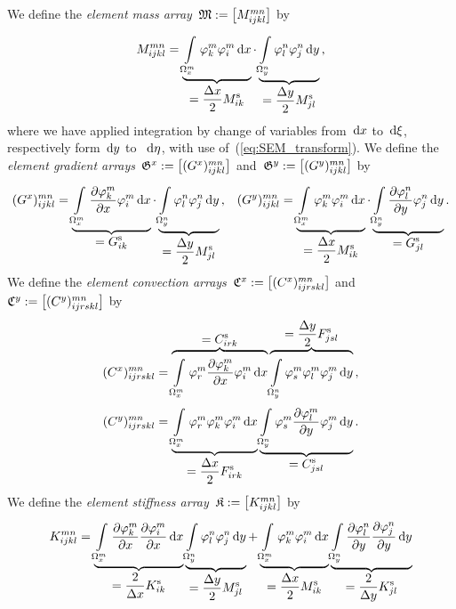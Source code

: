 \documentclass[10pt, ngerman, english,
twoside, open=right,
numbers=noenddot,
declaration=section,
abstract=section,
abstract=multiple,
abstract=notoc,
declaration=notoc,
cd=pale, 
chapterprefix=off, 
chapterpage=false, 
headingsvskip=-10em,
cdgeometry=custom, 
slantedgreek=on,
cdmath=on, 
cdfont=on,
ttfont=false,
mathswap=off,
]{tudscrreprt}
\numberwithin{equation}{chapter}
\newcommand{\sidenote}[1]{
  \leavevmode %
  \marginpar{\hyphenpenalty=1000 \flushleft{\textcolor{HKS41}{#1}}}}
\begin{document}
\sidenote{Element Arrays}We define the \textit{element mass array}~$\emat{M}:=\big[M^{mn}_{ijkl}\big]$ by
\begin{equation}
M^{mn}_{ijkl} = \underbrace{\bint{\varphi^m_k \varphi^m_i}{x}{\Omega_x^m}{}}_{\displaystyle = \frac{\Delta x}{2} M^\text{s}_{ik}} \cdot \underbrace{\bint{\varphi^n_l \varphi^n_j}{y}{\Omega_y^n}{}}_{\displaystyle = \frac{\Delta y}{2} M^\text{s}_{jl}}\text{,}
\end{equation}
where we have applied integration by change of variables from~$\d x$ to~$\d \xi$, respectively form~$\d y$ to ~$\d \eta$, with use of~(\ref{eq:SEM_transform}).
We define the \textit{element gradient arrays}~$\emat{G}^x := \big[(G^x)^{mn}_{ijkl}\big]$ and~$\emat{G}^y := \big[(G^y)^{mn}_{ijkl}\big]$ by
\begin{equation}
(G^x)^{mn}_{ijkl} = \underbrace{\bint{\pdiff{\varphi^m_k}{x} \varphi^m_i}{x}{\Omega_x^m}{}}_{\displaystyle = G^\text{s}_{ik}} \cdot \underbrace{\bint{\varphi^n_l \varphi^n_j}{y}{\Omega_y^n}{}}_{\displaystyle = \frac{\Delta y}{2} M^\text{s}_{jl}}\text{,} \quad
(G^y)^{mn}_{ijkl} = \underbrace{\bint{\varphi^m_k \varphi^m_i}{x}{\Omega_x^m}{}}_{\displaystyle = \frac{\Delta x}{2} M^\text{s}_{ik}} \cdot \underbrace{\bint{\pdiff{\varphi^n_l}{y} \varphi^n_j}{y}{\Omega_y^n}{}}_{\displaystyle = G^\text{s}_{jl}}\text{.}
\end{equation}
We define the \textit{element convection arrays}~$\emat{C}^x := \big[(C^x)^{mn}_{ijrskl}\big]$ and~$\emat{C}^y := \big[(C^y)^{mn}_{ijrskl}\big]$ by
\begin{equation}
\begin{aligned}
(C^x)^{mn}_{ijrskl} &= \overbrace{\bint{\varphi^m_r \pdiff{\varphi^m_k}{x} \varphi^m_i}{x}{\Omega_x^m}{}}^{\displaystyle = C^\text{s}_{irk}} \overbrace{\bint{\varphi^m_s \varphi^m_l \varphi^m_j}{y}{\Omega_y^n}{}}^{\displaystyle = \frac{\Delta y}{2} F^\text{s}_{jsl}}\text{,} \\*
(C^y)^{mn}_{ijrskl} &= \underbrace{\bint{\varphi^m_r \varphi^m_k \varphi^m_i}{x}{\Omega_x^m}{}}_{\displaystyle = \frac{\Delta x}{2} F^\text{s}_{irk}} \underbrace{\bint{\varphi^m_s \pdiff{\varphi^m_l}{y} \varphi^m_j}{y}{\Omega_y^n}{}}_{\displaystyle = C^\text{s}_{jsl}}\text{.}
\end{aligned}
\end{equation}
We define the \textit{element stiffness array}~$\emat{K} := \big[K^{mn}_{ijkl}\big]$ by
\begin{align}
K^{mn}_{ijkl} = \underbrace{\bint{\pdiff{\varphi^m_k}{x} \pdiff{\varphi^m_i}{x}}{x}{\Omega_x^m}{}}_{\displaystyle = \frac{2}{\Delta x} K^\text{s}_{ik}} \underbrace{\bint{\varphi^n_l \varphi^n_j}{y}{\Omega_y^n}{}}_{\displaystyle = \frac{\Delta y}{2} M^\text{s}_{jl}} +  \underbrace{\bint{\varphi^m_k \varphi^m_i}{x}{\Omega_x^m}{}}_{\displaystyle = \frac{\Delta x}{2} M^\text{s}_{ik}} \underbrace{\bint{\pdiff{\varphi^n_l}{y} \pdiff{\varphi^n_j}{y}}{y}{\Omega_y^n}{}}_{\displaystyle = \frac{2}{\Delta y} K^\text{s}_{jl}}
\end{align}\par
\end{document}
